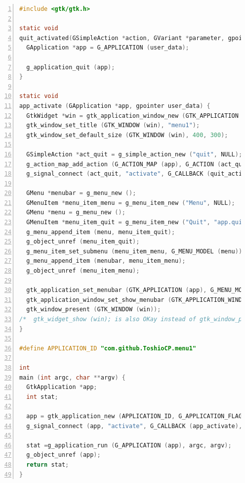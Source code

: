 \begin{lstlisting}[language=C, numbers=left]
#include <gtk/gtk.h>

static void
quit_activated(GSimpleAction *action, GVariant *parameter, gpointer user_data) {
  GApplication *app = G_APPLICATION (user_data);

  g_application_quit (app);
}

static void
app_activate (GApplication *app, gpointer user_data) {
  GtkWidget *win = gtk_application_window_new (GTK_APPLICATION (app));
  gtk_window_set_title (GTK_WINDOW (win), "menu1");
  gtk_window_set_default_size (GTK_WINDOW (win), 400, 300);

  GSimpleAction *act_quit = g_simple_action_new ("quit", NULL);
  g_action_map_add_action (G_ACTION_MAP (app), G_ACTION (act_quit));
  g_signal_connect (act_quit, "activate", G_CALLBACK (quit_activated), app);

  GMenu *menubar = g_menu_new ();
  GMenuItem *menu_item_menu = g_menu_item_new ("Menu", NULL);
  GMenu *menu = g_menu_new ();
  GMenuItem *menu_item_quit = g_menu_item_new ("Quit", "app.quit");
  g_menu_append_item (menu, menu_item_quit);
  g_object_unref (menu_item_quit);
  g_menu_item_set_submenu (menu_item_menu, G_MENU_MODEL (menu));
  g_menu_append_item (menubar, menu_item_menu);
  g_object_unref (menu_item_menu);

  gtk_application_set_menubar (GTK_APPLICATION (app), G_MENU_MODEL (menubar));
  gtk_application_window_set_show_menubar (GTK_APPLICATION_WINDOW (win), TRUE);
  gtk_window_present (GTK_WINDOW (win));
/*  gtk_widget_show (win); is also OKay instead of gtk_window_present. */
}

#define APPLICATION_ID "com.github.ToshioCP.menu1"

int
main (int argc, char **argv) {
  GtkApplication *app;
  int stat;

  app = gtk_application_new (APPLICATION_ID, G_APPLICATION_FLAGS_NONE);
  g_signal_connect (app, "activate", G_CALLBACK (app_activate), NULL);

  stat =g_application_run (G_APPLICATION (app), argc, argv);
  g_object_unref (app);
  return stat;
}
\end{lstlisting}

